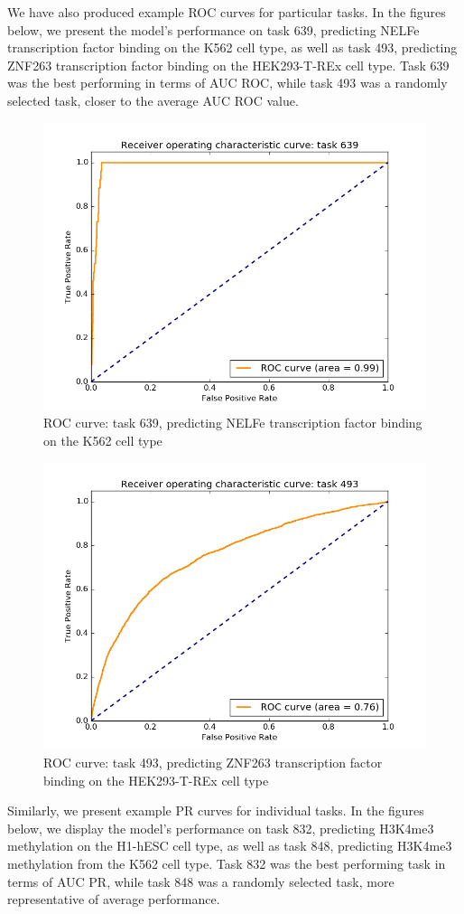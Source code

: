 \documentclass{article}
\begin{document}
We have also produced example ROC curves for particular tasks.  In the figures below, we present the model's performance on task 639, predicting NELFe transcription factor binding on the K562 cell type, as well as task 493, predicting ZNF263 transcription factor binding on the HEK293-T-REx cell type.  Task 639 was the best performing in terms of AUC ROC, while task 493 was a randomly selected task, closer to the average AUC ROC value.

\begin{figure}[h]
\centering \includegraphics[width=.7\textwidth]{figures/roc_example639.png}
\caption{ROC curve: task 639, predicting NELFe transcription factor binding on the K562 cell type}
\label{fig:t1}
\end{figure}

\begin{figure}[h]
\centering \includegraphics[width=.7\textwidth]{figures/roc_example493.png}
\caption{ROC curve: task 493, predicting ZNF263 transcription factor binding on the HEK293-T-REx cell type}
\label{fig:t2}
\end{figure}

Similarly, we present example PR curves for individual tasks.  In the figures below, we display the model's performance on task 832, predicting H3K4me3 methylation on the H1-hESC cell type, as well as task 848, predicting H3K4me3 methylation from the K562 cell type.  Task 832 was the best performing task in terms of AUC PR, while task 848 was a randomly selected task, more representative of average performance.
\end{document}
